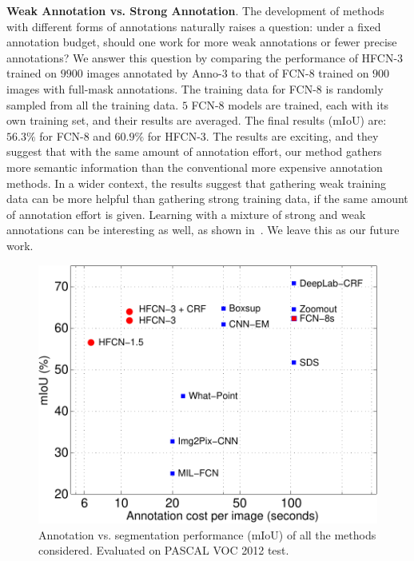 \documentclass[runningheads]{llncs}
\begin{document}
\textbf{Weak Annotation vs. Strong Annotation}. 
The development of methods with different forms of annotations naturally raises a question: under a fixed annotation budget, should one work for more weak annotations or fewer precise annotations?   We answer this question by comparing the performance of HFCN-3 trained on $9900$ images annotated by Anno-3 to that of FCN-8 trained on
$900$ images with full-mask annotations. The training data for FCN-8 is randomly sampled from all the training data. $5$ FCN-8 models are trained, each with its own training set, and their results are averaged. The final results (mIoU) are: $56.3\%$ for FCN-8  and $60.9\%$ for HFCN-3. The results are exciting, and they
suggest that with the same amount of annotation effort, our method gathers more semantic information than the
conventional more expensive annotation methods. In a wider context, the
results suggest that gathering  weak training data can
be more helpful than gathering strong training data,
if the same amount of annotation effort is given. 
Learning with a mixture of strong and weak annotations can be interesting as well, as shown in~\citep{BoxSup}. We leave this as our future work.


\begin{figure}  
\vspace{-5mm}
  \includegraphics[width=0.95\linewidth, height=0.65\linewidth]{fig6/anno_cost_mIoU.pdf}  \vspace{-3mm} 
  \caption{Annotation vs. segmentation performance (mIoU) of all the
    methods considered. Evaluated on PASCAL VOC 2012 test.}
\label{fig:6}  \vspace{-5mm}
\end{figure}
\end{document}
